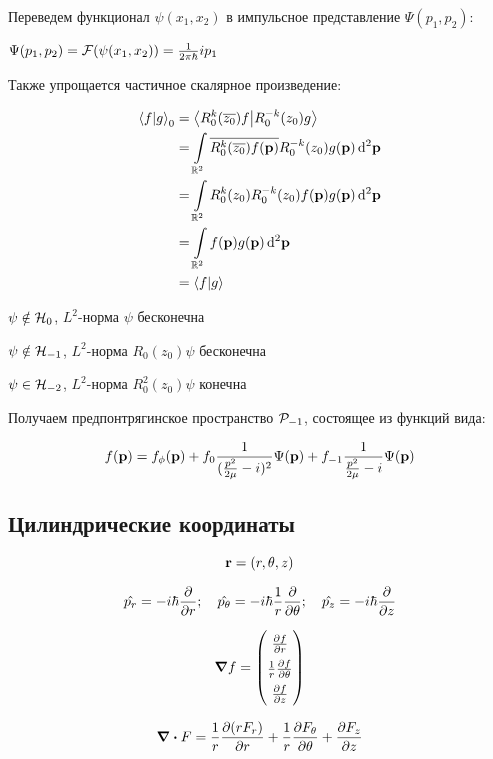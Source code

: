 Переведем функционал $\psi(x_1, x_2)$ в импульсное представление $\Psi(p_1, p_2)$:

$\Psi(p_1, p_2) = \mathcal{F}(\psi(x_1, x_2)) = \frac{1}{2 \pi \hbar} i p_1$

Также упрощается частичное скалярное произведение:

\begin{align*}
\ip{f}{g}_0
&= \ip{R_0^k(\cconj{z_0}) f}{R_0^{-k}(z_0) g} \\
&= \int\limits_{\bbR^2} \cconj{R_0^k(\cconj{z_0}) f(\vb{p})} R_0^{-k}(z_0) g(\vb{p}) \dd[2]{\vb{p}} \\
&= \int\limits_{\bbR^2} R_0^k(z_0) R_0^{-k}(z_0) f(\vb{p}) g(\vb{p}) \dd[2]{\vb{p}} \\
&= \int\limits_{\bbR^2} f(\vb{p}) g(\vb{p}) \dd[2]{\vb{p}} \\
&= \ip{f}{g}
\end{align*}

$\psi \notin \mathcal{H}_{0}$, $L^2$-норма $\psi$ бесконечна

$\psi \notin \mathcal{H}_{-1}$, $L^2$-норма $R_0(z_0) \psi$ бесконечна

$\psi \in \mathcal{H}_{-2}$, $L^2$-норма $R_0^2(z_0) \psi$ конечна

Получаем предпонтрягинское пространство $\mathcal{P}_{-1}$, состоящее из функций вида:

\[
f(\vb{p}) = f_\phi(\vb{p}) + f_0 \frac{1}{(\frac{p^2}{2 \mu} - i)^2} \Psi(\vb{p}) + f_{-1} \frac{1}{\frac{p^2}{2 \mu} - i} \Psi(\vb{p})
\]

\subsection{Цилиндрические координаты}

\[
\vb{r} = (r, \theta, z)
\]

\[
\hat {p_r} = - i \hbar \pdv{r};\quad 
\hat{p_\theta} = - i \hbar \frac{1}{r} \pdv{\theta};\quad 
\hat{p_z} = - i \hbar \pdv{z}
\]

$$\renewcommand\arraystretch{1.5}
\gradient f = 
\begin{pmatrix}
\pdv{f}{r} \\
\frac{1}{r} \pdv{f}{\theta}  \\
\pdv{f}{z} 
\end{pmatrix}
$$


$$
\divergence F =
\frac{1}{r} \pdv{(r F_r)}{r}
+ \frac{1}{r} \pdv{F_\theta}{\theta}
+ \pdv{F_z}{z}
$$